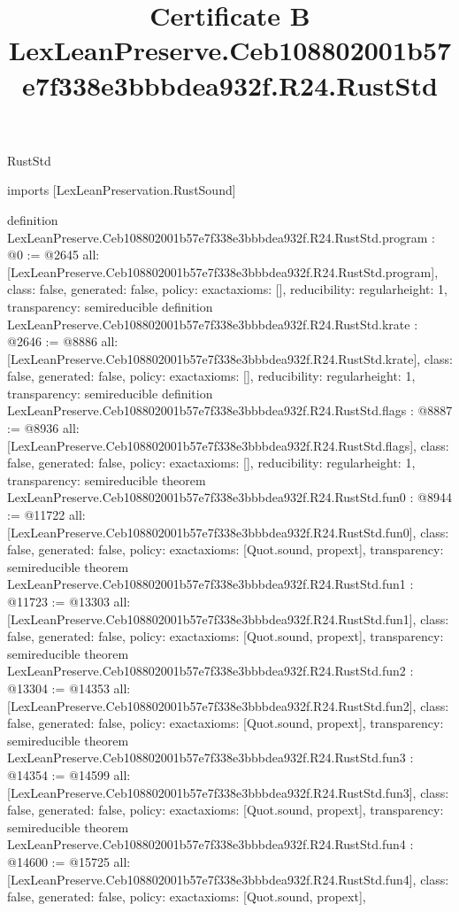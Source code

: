 \begin{lexlean}{RustStd}
\title{Certificate B LexLeanPreserve.Ceb108802001b57e7f338e3bbbdea932f.R24.RustStd}
\begin{coremodule}
imports [LexLeanPreservation.RustSound]

definition LexLeanPreserve.Ceb108802001b57e7f338e3bbbdea932f.R24.RustStd.program : @0 := @2645 {
  all: [LexLeanPreserve.Ceb108802001b57e7f338e3bbbdea932f.R24.RustStd.program],
  class: false,
  generated: false,
  policy: exact{axioms: []},
  reducibility: regular{height: 1},
  transparency: semireducible
}
definition LexLeanPreserve.Ceb108802001b57e7f338e3bbbdea932f.R24.RustStd.krate : @2646 := @8886 {
  all: [LexLeanPreserve.Ceb108802001b57e7f338e3bbbdea932f.R24.RustStd.krate],
  class: false,
  generated: false,
  policy: exact{axioms: []},
  reducibility: regular{height: 1},
  transparency: semireducible
}
definition LexLeanPreserve.Ceb108802001b57e7f338e3bbbdea932f.R24.RustStd.flags : @8887 := @8936 {
  all: [LexLeanPreserve.Ceb108802001b57e7f338e3bbbdea932f.R24.RustStd.flags],
  class: false,
  generated: false,
  policy: exact{axioms: []},
  reducibility: regular{height: 1},
  transparency: semireducible
}
theorem LexLeanPreserve.Ceb108802001b57e7f338e3bbbdea932f.R24.RustStd.fun0 : @8944 := @11722 {
  all: [LexLeanPreserve.Ceb108802001b57e7f338e3bbbdea932f.R24.RustStd.fun0],
  class: false,
  generated: false,
  policy: exact{axioms: [Quot.sound, propext]},
  transparency: semireducible
}
theorem LexLeanPreserve.Ceb108802001b57e7f338e3bbbdea932f.R24.RustStd.fun1 : @11723 := @13303 {
  all: [LexLeanPreserve.Ceb108802001b57e7f338e3bbbdea932f.R24.RustStd.fun1],
  class: false,
  generated: false,
  policy: exact{axioms: [Quot.sound, propext]},
  transparency: semireducible
}
theorem LexLeanPreserve.Ceb108802001b57e7f338e3bbbdea932f.R24.RustStd.fun2 : @13304 := @14353 {
  all: [LexLeanPreserve.Ceb108802001b57e7f338e3bbbdea932f.R24.RustStd.fun2],
  class: false,
  generated: false,
  policy: exact{axioms: [Quot.sound, propext]},
  transparency: semireducible
}
theorem LexLeanPreserve.Ceb108802001b57e7f338e3bbbdea932f.R24.RustStd.fun3 : @14354 := @14599 {
  all: [LexLeanPreserve.Ceb108802001b57e7f338e3bbbdea932f.R24.RustStd.fun3],
  class: false,
  generated: false,
  policy: exact{axioms: [Quot.sound, propext]},
  transparency: semireducible
}
theorem LexLeanPreserve.Ceb108802001b57e7f338e3bbbdea932f.R24.RustStd.fun4 : @14600 := @15725 {
  all: [LexLeanPreserve.Ceb108802001b57e7f338e3bbbdea932f.R24.RustStd.fun4],
  class: false,
  generated: false,
  policy: exact{axioms: [Quot.sound, propext]},
}
\end{coremodule}
\end{lexlean}
